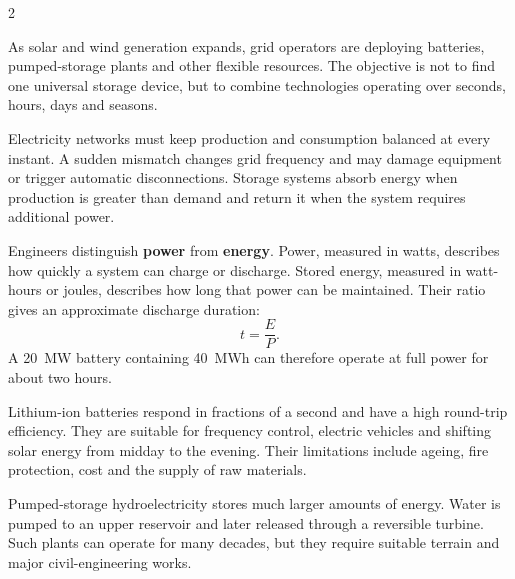 

\begin{multicols}{2}

\begin{engineeringnews}
As solar and wind generation expands, grid operators are deploying batteries,
pumped-storage plants and other flexible resources. The objective is not to find one
universal storage device, but to combine technologies operating over seconds, hours, days
and seasons.
\end{engineeringnews}

\begin{ecarticle}
Electricity networks must keep production and consumption balanced at every instant. A
sudden mismatch changes grid frequency and may damage equipment or trigger automatic
disconnections. Storage systems absorb energy when production is greater than demand and
return it when the system requires additional power.

Engineers distinguish \textbf{power} from \textbf{energy}. Power, measured in watts,
describes how quickly a system can charge or discharge. Stored energy, measured in
watt-hours or joules, describes how long that power can be maintained. Their ratio gives an
approximate discharge duration:
\[
t=\frac{E}{P}.
\]
A 20~MW battery containing 40~MWh can therefore operate at full power for about two hours.

Lithium-ion batteries respond in fractions of a second and have a high round-trip
efficiency. They are suitable for frequency control, electric vehicles and shifting solar
energy from midday to the evening. Their limitations include ageing, fire protection, cost
and the supply of raw materials.

Pumped-storage hydroelectricity stores much larger amounts of energy. Water is pumped to an
upper reservoir and later released through a reversible turbine. Such plants can operate for
many decades, but they require suitable terrain and major civil-engineering works.


\end{ecarticle}
\end{multicols}
